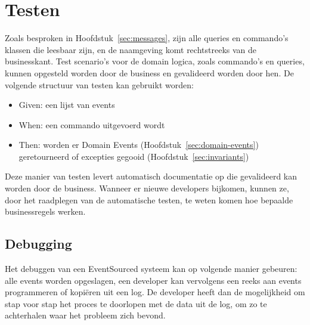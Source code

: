 
\section{Testen}
\label{sec:testen}

Zoals besproken in Hoofdstuk~\ref{sec:messages}, zijn alle queries en commando’s klassen die leesbaar zijn, en de naamgeving komt rechtstreeks van de businesskant. Test scenario's voor de domain logica, zoals commando’s en queries, kunnen opgesteld worden door de business en gevalideerd worden door hen.
De volgende structuur van testen kan gebruikt worden:

\begin{itemize}
  \item{Given: een lijst van events}
  \item{When: een commando uitgevoerd wordt}
  \item{Then: worden er Domain Events (Hoofdstuk~\ref{sec:domain-events}) geretourneerd of excepties gegooid (Hoofdstuk~\ref{sec:invariants})}
\end{itemize}

Deze manier van testen levert automatisch documentatie op die gevalideerd kan worden door de business.
Wanneer er nieuwe developers bijkomen, kunnen ze, door het raadplegen van de automatische testen, te weten komen hoe bepaalde businessregels werken.


\subsection{Debugging}
\label{subsec:debugging}

Het debuggen van een EventSourced systeem kan op volgende manier gebeuren: alle events worden opgeslagen, een developer kan vervolgens een reeks aan events programmeren of kopiëren uit een \gls{log}. De developer heeft dan de mogelijkheid om stap voor stap het proces te doorlopen met de data uit de \gls{log}, om zo te achterhalen waar het probleem zich bevond.